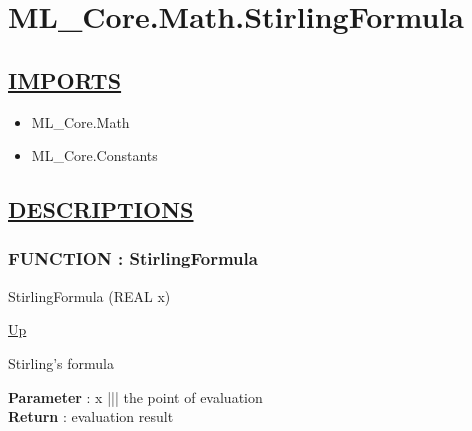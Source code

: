 \chapter*{ML\_Core.Math.StirlingFormula}
\hypertarget{ecldoc:toc:ML_Core.Math.StirlingFormula}{}

\section*{\underline{IMPORTS}}
\begin{itemize}
\item ML\_Core.Math
\item ML\_Core.Constants
\end{itemize}

\section*{\underline{DESCRIPTIONS}}
\subsection*{FUNCTION : StirlingFormula}
\hypertarget{ecldoc:ml_core.math.stirlingformula}{}
\begin{minipage}[t]{\textwidth}
\begin{flushleft}
 StirlingFormula (REAL x)
\end{flushleft}
\end{minipage}
\hyperlink{ecldoc:toc:ML_Core/Math}{Up}

\par
Stirling's formula
\par
\textbf{Parameter} : x ||| the point of evaluation \\
\textbf{Return} : evaluation result \\
